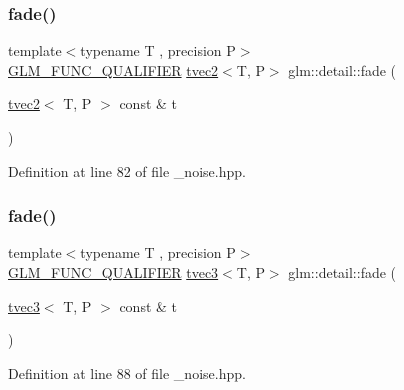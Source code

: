 \mbox{\label{namespaceglm_1_1detail_ab0a5374736735becd50c327f859ed62e}} 
\subsubsection{\texorpdfstring{fade()}{fade()}\hspace{0.1cm}{\footnotesize\ttfamily [1/3]}}
{\footnotesize\ttfamily template$<$typename T , precision P$>$ \\
\mbox{\hyperlink{setup_8hpp_a33fdea6f91c5f834105f7415e2a64407}{G\+L\+M\+\_\+\+F\+U\+N\+C\+\_\+\+Q\+U\+A\+L\+I\+F\+I\+ER}} \mbox{\hyperlink{structglm_1_1tvec2}{tvec2}}$<$T, P$>$ glm\+::detail\+::fade (\begin{DoxyParamCaption}\item[{\mbox{\hyperlink{structglm_1_1tvec2}{tvec2}}$<$ T, P $>$ const \&}]{t }\end{DoxyParamCaption})}



Definition at line 82 of file \+\_\+noise.\+hpp.

\mbox{\label{namespaceglm_1_1detail_a9bf0a71c4b1705018e6f8f6be966f023}} 
\subsubsection{\texorpdfstring{fade()}{fade()}\hspace{0.1cm}{\footnotesize\ttfamily [2/3]}}
{\footnotesize\ttfamily template$<$typename T , precision P$>$ \\
\mbox{\hyperlink{setup_8hpp_a33fdea6f91c5f834105f7415e2a64407}{G\+L\+M\+\_\+\+F\+U\+N\+C\+\_\+\+Q\+U\+A\+L\+I\+F\+I\+ER}} \mbox{\hyperlink{structglm_1_1tvec3}{tvec3}}$<$T, P$>$ glm\+::detail\+::fade (\begin{DoxyParamCaption}\item[{\mbox{\hyperlink{structglm_1_1tvec3}{tvec3}}$<$ T, P $>$ const \&}]{t }\end{DoxyParamCaption})}



Definition at line 88 of file \+\_\+noise.\+hpp.

\mbox{\label{namespaceglm_1_1detail_adfc056f3be3f0501412b6d8c8d1b60fb}} 
